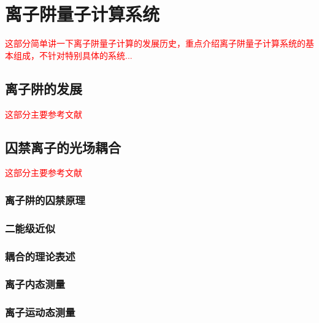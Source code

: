 
\chapter[离子阱量子计算系统]{离子阱量子计算系统}

\textcolor{red}{
这部分简单讲一下离子阱量子计算的发展历史，重点介绍离子阱量子计算系统的基本组成，不针对特别具体的系统...
}

\section[离子阱的发展]{离子阱的发展}

\textcolor{red}{这部分主要参考文献\cite[p2]{Bruzewicz_Chiaverini_McConnell_Sage_2019}}






\section[囚禁离子的光场耦合]{囚禁离子的光场耦合}
\textcolor{red}{这部分主要参考文献\cite[p3-8]{Leibfried_Blatt_Monroe_Wineland_2003}}
\subsection[离子阱的囚禁原理]{离子阱的囚禁原理}

\subsection[二能级近似]{二能级近似}

\subsection[耦合的理论表述]{耦合的理论表述}

\subsection[离子内态测量]{离子内态测量}


\subsection[离子运动态测量]{离子运动态测量}














